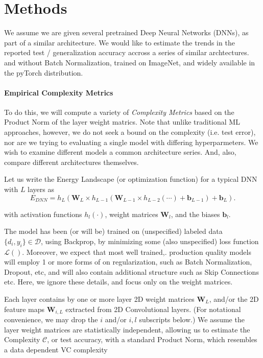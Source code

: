 \section{Methods}
\label{sxn:methods}

We assume we are given several pretrained Deep Neural Networks (DNNs), as part of a similar architecture.
We would like to estimate the trends in the reported test / generalization accuracy accross a series of similar archtectures.  
and without Batch Normalization, trained on ImageNet, and widely available in the pyTorch distribution.

\paragraph{Empirical Complexity Metrics}
To do this, we will compute a variety of \emph{Complexity Metrics} based on the Product Norm of the layer weight matrics.
Note that unlike traditional ML approaches, however, we do not seek a bound on the complexity (i.e. test error), 
nor are we trying to evaluating a single model with differing hyperparmeters.  We wish to examine different models a 
common architecture series. And, also, compare different architectures themselves.  

Let us write the Energy Landscape (or optimization function) for a typical DNN with $L$ layers as
\begin{equation}
E_{DNN}=h_{L}(\mathbf{W}_{L}\times h_{L-1}(\mathbf{W}_{L-1}\times h_{L-2}(\cdots)+\mathbf{b}_{L-1})+\mathbf{b}_{L})  .
\label{eqn:dnn_energy}
\end{equation}

with activation functions $h_{l}(\cdot)$,  weight matrices $\mathbf{W}_{l}$, and the biases $\mathbf{b}_{l}$.

The model has been (or will be) trained on (unspecified) labeled data $\{d_{i},y_{i}\}\in\mathcal{D}$, 
using Backprop, by minimizing some (also unspecified) loss function $\mathcal{L}()$.  Moreover, we expect that most well trained,. production quality models will employ 1 or more forms of on regularization, such as Batch Normalization, Dropout, etc, and will also contain additional structure such as Skip Connections etc. Here, we ignore these details, and focus only on the weight matrices. 

Each layer contains by one or more layer 2D weight matrices $\mathbf{W}_{L}$, and/or the 2D feature maps $\mathbf{W}_{i,L}$ extracted from 2D Convolutional layers.  (For notational convenience, we may drop the $i$ and/or $i,l$ subscripts below.) We assume the layer weight matrices are statistically independent, allowing us to estimate the Complexity $\mathcal{C}$, or test accuracy, with a standard Product Norm, which resembles a data dependent VC complexity

